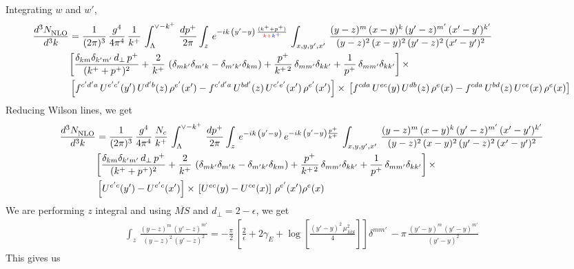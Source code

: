 \documentclass[9pt]{article}
\numberwithin{equation}{section}
\begin{document}
Integrating $w$ and $w'$,
\begin{align}
     \frac{d^{3}N_{\rm NLO}^{\rm}}{d^{3}k}  & = \frac{1}{(2\pi)^{3}}\,\frac{g^{4}}{4\pi^{4}}\,\frac{1}{k^{+}}\,\int_{\Lambda}^{\vee-k^{+}}\, \frac{dp^{+}}{2\pi}\int_{z}\,e^{-ik\,\left(y'-y\right)\, \frac{(k^{+}+p^{+})}{{\color{red}k{+}}{\color{blue}k^{+}}}}\,\int_{x,y,y^{\prime},x'}\,\frac{(y-z)^{m}\,(x-y)^{k}\,(y'-z)^{m'}\,(x'-y')^{k'}}{(y-z)^{2}\,(x-y)^{2}\,(y'-z)^{2}\,(x'-y')^{2}}\notag \\ &  \bigg[\frac{\delta_{km}\delta_{k'm'}\,d_{\perp}\,p^{+}}{(k^{+}+p^{+})^{2}}+\frac{2}{k^{+}}\,\left(\delta_{mk'}\delta_{m'k}-\delta_{m'k'}\delta_{km}\right) + \frac{p^{+}}{k^{+\,2}}\,\delta_{mm'}\delta_{kk'}+\frac{1}{p^{+}}\,\delta_{mm'}\delta_{kk'}\bigg]\,\times\,\notag \\ & \left[f^{c'd'a}\,U^{e'c'}(y')\,U^{d'b}(z)\,\rho^{e'}(x')-f^{c'd'a}\, 
    U^{bd'}(z)\,U^{c'e'}(x')\,\rho^{e'}(x')\right]\times\, \left[f^{cda}\,U^{ec}(y)\,U^{db}(z)\,\rho^{e}(x)-f^{cda}\, 
    U^{bd}(z)\,U^{ce}(x)\,\rho^{e}(x)\right]
\end{align}
Reducing Wilson lines, we get
\begin{align}
     \frac{d^{3}N_{\rm NLO}^{\rm}}{d^{3}k}  & = \frac{1}{(2\pi)^{3}}\,\frac{g^{4}}{4\pi^{4}}\,\frac{N_{c}}{k^{+}}\,\int_{\Lambda}^{\vee-k^{+}}\, \frac{dp^{+}}{2\pi}\int_{z}\,e^{-ik\,\left(y'-y\right)}\,e^{-ik\,\left(y'-y\right)\frac{p^{+}}{k^{+}}}\,\int_{x,y,y^{\prime},x'}\,\frac{(y-z)^{m}\,(x-y)^{k}\,(y'-z)^{m'}\,(x'-y')^{k'}}{(y-z)^{2}\,(x-y)^{2}\,(y'-z)^{2}\,(x'-y')^{2}}\notag \\ &  \bigg[\frac{\delta_{km}\delta_{k'm'}\,d_{\perp}\,p^{+}}{(k^{+}+p^{+})^{2}}+\frac{2}{k^{+}}\,\left(\delta_{mk'}\delta_{m'k}-\delta_{m'k'}\delta_{km}\right) + \frac{p^{+}}{k^{+\,2}}\,\delta_{mm'}\delta_{kk'}+\frac{1}{p^{+}}\,\delta_{mm'}\delta_{kk'}\bigg]\,\times\,\notag \\ & \left[U^{e'c}(y') - U^{e'c}(x')\right] \times\, \left[U^{ec}(y) - U^{ce}(x)\right]\, \rho^{e'}(x') \rho^{e}(x)
\end{align}
We are performing $z$ integral and using $\overline{MS}$ and $d_{\perp} = 2-\epsilon$, we get
\begin{align}
    \int_{z}\, \frac{(y-z)^{m}\,(y'-z)^{m'}}{(y-z)^{2}\,(y'-z)^{2}} = -\frac{\pi}{2}\, \left[\frac{2}{\epsilon} +2\gamma_{E} + \log{\left[\frac{(y'-y)^{2}\,\mu^{2}_{\overline{MS}}}{4}\right]}\right]\delta^{mm'}\, - \pi\, \frac{(y'-y)^{m}\,(y'-y)^{m'}}{(y'-y)^{2}}
\end{align}
This gives us
\end{document}
